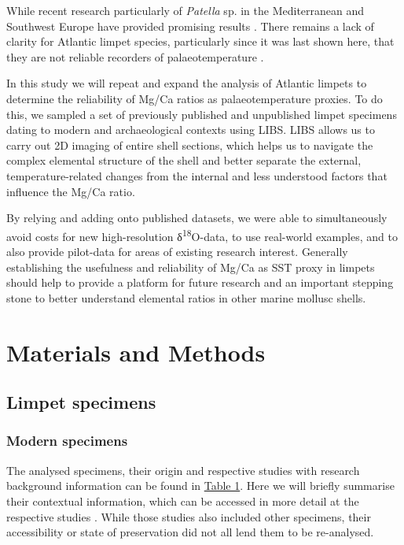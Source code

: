 \documentclass[
  authoryear,
  preprint,
  3p]{elsarticle}
\begin{document}
While recent research particularly of \emph{Patella} sp. in the
Mediterranean and Southwest Europe have provided promising results
\citep{Hausmann2019-fi, Garcia-Escarzaga2015-jc, Garcia-Escarzaga2018-nf}.
There remains a lack of clarity for Atlantic limpet species,
particularly since it was last shown here, that they are not reliable
recorders of palaeotemperature \citep{Graniero2015-zv}.

In this study we will repeat and expand the analysis of Atlantic limpets
to determine the reliability of Mg/Ca ratios as palaeotemperature
proxies. To do this, we sampled a set of previously published and
unpublished limpet specimens dating to modern and archaeological
contexts using LIBS. LIBS allows us to carry out 2D imaging of entire
shell sections, which helps us to navigate the complex elemental
structure of the shell and better separate the external,
temperature-related changes from the internal and less understood
factors that influence the Mg/Ca ratio.

By relying and adding onto published datasets, we were able to
simultaneously avoid costs for new high-resolution
δ\textsuperscript{18}O-data, to use real-world examples, and to also
provide pilot-data for areas of existing research interest. Generally
establishing the usefulness and reliability of Mg/Ca as SST proxy in
limpets should help to provide a platform for future research and an
important stepping stone to better understand elemental ratios in other
marine mollusc shells.

\section{Materials and Methods}\label{Methods}

\subsection{Limpet specimens}\label{limpet-specimens}

\subsubsection{Modern specimens}\label{modern-specimens}

The analysed specimens, their origin and respective studies with
research background information can be found in \hyperref[Table_1]{Table
1}. Here we will briefly summarise their contextual information, which
can be accessed in more detail at the respective studies
\citep{Nicastro2020-ih, Surge2012-ba, Graniero2017-io}. While those
studies also included other specimens, their accessibility or state of
preservation did not all lend them to be re-analysed.
\end{document}
